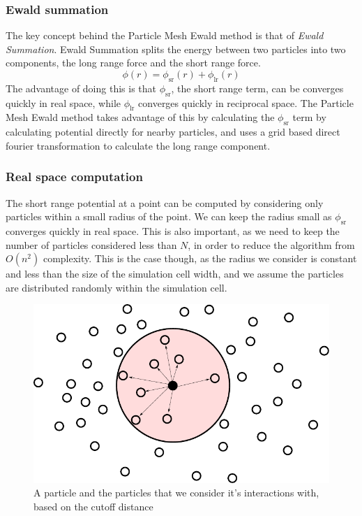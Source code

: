 \documentclass[pdftex,twoside,a4paper]{report}
\newcommand{\bcen}{\begin{center}}
\newcommand{\ecen}{\end{center}}
\newcommand{\pmem}{Particle Mesh Ewald method}
\begin{document}
\subsubsection{Ewald summation}
The key concept behind the \pmem{} is that of \emph{Ewald Summation}. Ewald Summation splits the energy between two particles into two components, the long range force and the short range force. \cite{petersen:3668}
\[
\phi(r) = \phi_{\text{sr}}(r) + \phi_{\text{lr}}(r)
\]
The advantage of doing this is that $\phi_{\text{sr}}$, the short range term, can be converges quickly in real space, while $\phi_{\text{lr}}$ converges quickly in reciprocal space. The \pmem{} takes advantage of this by calculating the $\phi_{\text{sr}}$ term by calculating potential directly for nearby particles, and uses a grid based direct fourier transformation to calculate the long range component.
\subsubsection{Real space computation}
The short range potential at a point can be computed by considering only particles within a small radius of the point. We can keep the radius small as $\phi_{\text{sr}}$ converges quickly in real space. This is also important, as we need to keep the number of particles considered less than $N$, in order to reduce the algorithm from $O(n^2)$ complexity. This is the case though, as the radius we consider is constant and less than the size of the simulation cell width, and we assume the particles are distributed randomly within the simulation cell.
\begin{figure}[H]
\bcen \includegraphics{figures/cutoff.pdf} \ecen
\caption{A particle and the particles that we consider it's interactions with, based on the cutoff distance}
\end{figure}
\end{document}
